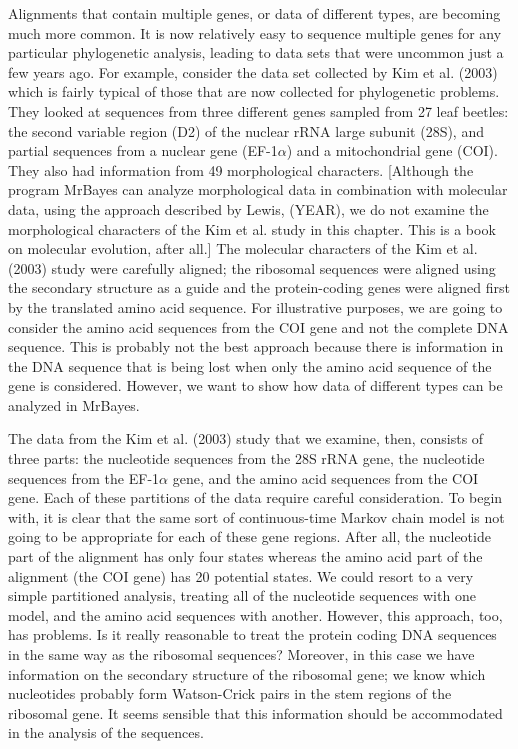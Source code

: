 \documentclass{svmult}
\begin{document}
Alignments that contain multiple genes, or data of different types, are becoming much more common.
It is now relatively easy to sequence multiple genes for any particular phylogenetic analysis,
leading to data sets that were uncommon just a few years ago. For example, consider the data set
collected by Kim et al. (2003) which is fairly typical of those that are now collected for
phylogenetic problems. They looked at sequences from three different genes sampled from 27 leaf
beetles: the second variable region (D2) of the nuclear rRNA large subunit (28S), and partial
sequences from a nuclear gene (EF-1$\alpha$) and a mitochondrial gene (COI). They also had
information from 49 morphological characters. [Although the program MrBayes can analyze
morphological data in combination with molecular data, using the approach described by Lewis,
(YEAR), we do not examine the morphological characters of the Kim et al. study in this chapter.
This is a book on molecular evolution, after all.] The molecular characters of the Kim et al.
(2003) study were carefully aligned; the ribosomal sequences were aligned using the secondary
structure as a guide and the protein-coding genes were aligned first by the translated amino acid
sequence. For illustrative purposes, we are going to consider the amino acid sequences from the COI
gene and not the complete DNA sequence. This is probably not the best approach because there is
information in the DNA sequence that is being lost when only the amino acid sequence of the gene is
considered.  However, we want to show how data of different types can be analyzed in MrBayes.

The data from the Kim et al. (2003) study that we examine, then, consists of three parts: the
nucleotide sequences from the 28S rRNA gene, the nucleotide sequences from the EF-1$\alpha$ gene,
and the amino acid sequences from the COI gene. Each of these partitions of the data require
careful consideration. To begin with, it is clear that the same sort of continuous-time Markov
chain model is not going to be appropriate for each of these gene regions. After all, the
nucleotide part of the alignment has only four states whereas the amino acid part of the alignment
(the COI gene) has 20 potential states. We could resort to a very simple partitioned analysis,
treating all of the nucleotide sequences with one model, and the amino acid sequences with another.
However, this approach, too, has problems. Is it really reasonable to treat the protein coding DNA
sequences in the same way as the ribosomal sequences? Moreover, in this case we have information on
the secondary structure of the ribosomal gene; we know which nucleotides probably form Watson-Crick
pairs in the stem regions of the ribosomal gene. It seems sensible that this information should be
accommodated in the analysis of the sequences. 
\end{document}
